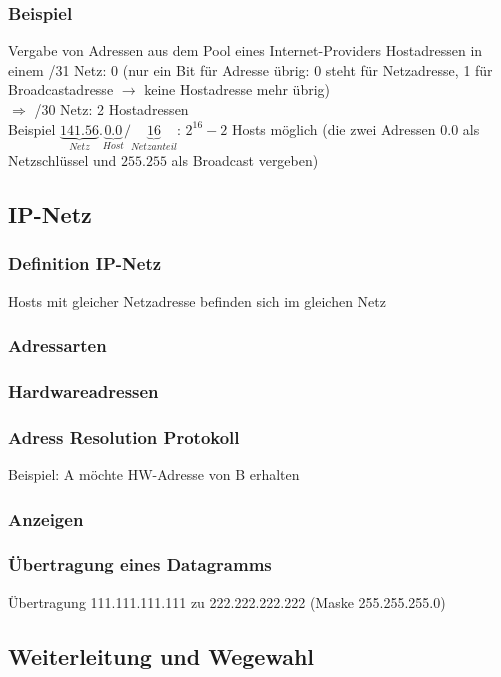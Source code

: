 \subsubsection*{Beispiel}
Vergabe von Adressen aus dem Pool eines Internet-Providers
Hostadressen in einem /31 Netz: 0 (nur ein Bit für Adresse übrig: 0 steht für Netzadresse, 1 für Broadcastadresse $\to$ keine Hostadresse mehr übrig)\\
$\Rightarrow$ /30 Netz: 2 Hostadressen\bigskip\\
Beispiel $\underbrace{141.56}_{Netz}.\underbrace{0.0}_{Host}/\underbrace{16}_{Netzanteil}$: $2^{16}-2$ Hosts möglich (die zwei Adressen $0.0$ als Netzschlüssel und $255.255$ als Broadcast vergeben)
\subsection{IP-Netz}
\subsubsection{Definition IP-Netz}
Hosts mit gleicher Netzadresse befinden sich im gleichen Netz
\subsubsection{Adressarten}
\subsubsection{Hardwareadressen}
\subsubsection{Adress Resolution Protokoll}
Beispiel: A möchte HW-Adresse von B erhalten
\subsubsection*{Anzeigen}
\subsubsection{Übertragung eines Datagramms}
Übertragung 111.111.111.111 zu 222.222.222.222 (Maske 255.255.255.0)

\subsection{Weiterleitung und Wegewahl}

